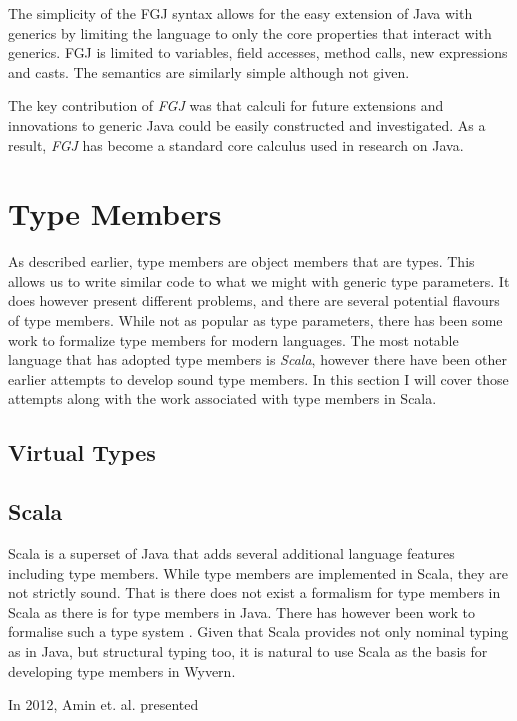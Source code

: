\documentclass[11pt
              , a4paper
              , twoside
              , openright
              ]{report}
\numberwithin{case}{theorem}
\numberwithin{subcase}{case}
\begin{document}
The simplicity of the FGJ syntax allows for the easy extension of Java with generics \cite{Potanin:2006:GOG:1167473.1167500, Zibin:2010:OIG:1932682.1869509} by limiting the language to only the core properties that interact with generics. FGJ is limited to variables, field accesses, method calls, new expressions and casts. The semantics are similarly simple although not given. 

The key contribution of \emph{FGJ} was that calculi for future extensions and innovations to generic Java could be easily constructed and investigated. As a result, \emph{FGJ} has become a standard core calculus used in research on Java.

\section{Type Members}
As described earlier, type members are object members that are types. This allows us to write similar code to what we might with generic type parameters. It does however present different problems, and there are several potential flavours of type members.
While not as popular as type parameters, there has been some work to formalize type members for modern languages. The most notable language that has adopted type members is \emph{Scala}, however there have been other earlier attempts to develop sound type members. In this section I will cover those attempts along with the work associated with type members in Scala.

\subsection{Virtual Types}

\subsection{Scala}
Scala \cite{scaladocs2016} is a superset of Java that adds several additional language features including type members. While type members are implemented in Scala, they are not strictly sound. That is there does not exist a formalism for type members in Scala as there is for type members in Java. There has however been work to formalise such a type system \cite{Amin:2014:FPT:2660193.2660216,amin:fool:2012}. Given that Scala provides not only nominal typing as in Java, but structural typing too, it is natural to use Scala as the basis for developing type members in Wyvern.

In 2012, Amin et. al. \cite{amin:fool:2012} presented 
\end{document}
